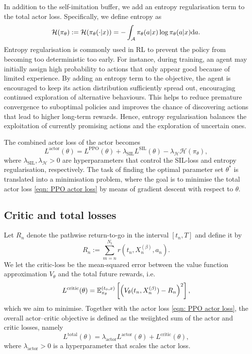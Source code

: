 In addition to the self-imitation buffer, we add an entropy regularisation term to the total actor loss. Specifically, we define entropy as 
\begin{equation}
    \mathcal{H}(\pi_\theta) := \mathcal{H}(\pi_\theta(\cdot | x)) = - \int_{\mathcal{A}} \pi_\theta (a|x) \log \pi_\theta (a | x) \mathrm{d} a. 
    \label{eqn: entropy regularisation}
\end{equation}
Entropy regularisation is commonly used in RL to prevent the policy from becoming too deterministic too early. For instance, during training, an agent may initially assign high probability to actions that only appear good because of limited experience. By adding an entropy term to the objective, the agent is encouraged to keep its action distribution  sufficiently spread out, encouraging continued exploration of alternative behaviours. This helps to reduce premature convergence to suboptimal policies and improves the chance of discovering actions that lead to higher long-term rewards. Hence, entropy regularisation balances the exploitation of currently promising actions and the exploration of uncertain ones. 

The combined actor loss of the actor becomes 
\begin{equation}
    L^{\text{actor}}(\theta) = L^{\text{PPO}}(\theta) + \lambda_{\text{SIL}} L^{\text{SIL}}(\theta) - \lambda_{\mathcal{H}} \mathcal{H}(\pi_\theta),
    \label{eqn: PPO actor loss}
\end{equation}
where $\lambda_{\text{SIL}}, \lambda_{\mathcal{H}} > 0$ are hyperparameters that control the SIL-loss and entropy regularisation, respectively. The task of finding the optimal parameter set $\theta^*$ is translated into a minimisation problem, where the goal is to minimise the total actor loss \eqref{eqn: PPO actor loss} by means of gradient descent with respect to $\theta$.

\subsection{Critic and total losses}
Let $R_n$ denote the pathwise return-to-go in the interval $[t_n,T]$ and define it by
\begin{equation}
    R_n := \sum_{m=n}^{N_t} r(t_n,X^{(\beta)}_n,a_n).
    \label{eqn: return-to-go}
\end{equation}
We let the critic-loss be the mean-squared error between the value function approximation $V_\theta$ and the total future rewards, i.e.
\begin{equation}
    L^{\text{critic}}(\theta) = \mathbb{E}^{(t_0,x)}_{\pi_\theta}\left[ \left(V_\theta(t_n,X^{(\beta)}_n) - R_n\right)^2 \right],
    \label{eqn: L-critic}
\end{equation}
which we aim to minimise. Together with the actor loss \eqref{eqn: PPO actor loss}, the overall actor–critic objective is defined as the weiighted sum of the actor and critic losses, namely
\begin{equation*}
    L^{\text{total}}(\theta) = \lambda_{\text{actor}} L^{\text{actor}}(\theta) + L^{\text{critic}}(\theta),
\end{equation*}
where $\lambda_{\text{actor}}>0$ is a hyperparameter that scales the actor loss. 

